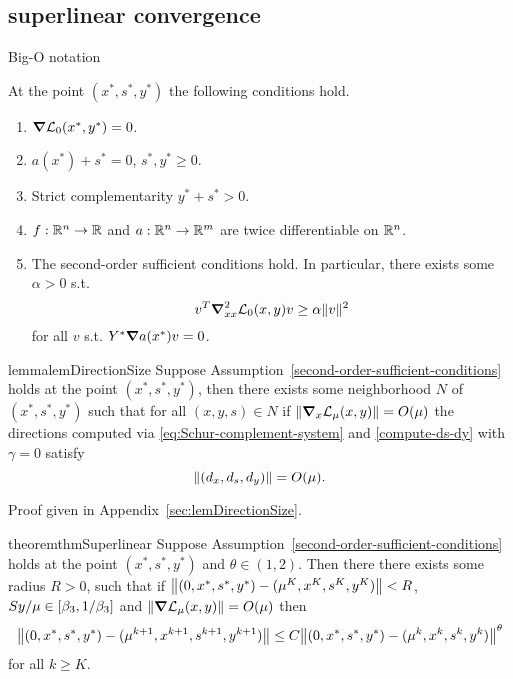 \documentclass{article}
\begin{document}

\if{}

\subsection{superlinear convergence}


\begin{definition}
Big-O notation
\end{definition}

\begin{assumption}\label{second-order-sufficient-conditions}
At the point $(x^{*},s^{*},y^{*})$ the following conditions hold.
\begin{enumerate}
\item $\grad \mathcal{L}_{0}(x^{*}, y^{*}) = 0$.
\item $a(x^{*}) + s^{*} = 0$, $s^{*}, y^{*} \ge 0$.
\item Strict complementarity $y^{*} + s^{*} > 0$.
\item $f : \mathbb{R}^{n} \rightarrow \mathbb{R}$ and $a : \mathbb{R}^{n} \rightarrow \mathbb{R}^{m}$ are twice differentiable on $\mathbb{R}^{n}$.
\item The second-order sufficient conditions hold. In particular, there exists some $\alpha > 0$ s.t.
$$
v^T \grad^2_{xx} \mathcal{L}_{0}(x,y) v \ge \alpha \| v \|^2
$$
for all $v$ s.t. $Y^{*} \grad a(x^{*}) v = 0$.
\end{enumerate}
\end{assumption}

\begin{restatable}{lemma}{lemDirectionSize}\label{lemDirectionSize}
Suppose Assumption~\ref{second-order-sufficient-conditions} holds at the point $(x^{*}, s^{*}, y^{*})$, then there exists some neighborhood $N$ of $(x^{*},s^{*},y^{*})$ such that for all $(x,y,s) \in N$ if $\| \grad_{x} \mathcal{L}_{\mu}(x,y) \|  = O(\mu)$ the directions computed via \eqref{eq:Schur-complement-system} and \eqref{compute-ds-dy} with  $\gamma = 0$ satisfy 
$$\| (d_{x}, d_{s}, d_{y}) \| =  O( \mu  ).$$
\end{restatable}

Proof given in Appendix~\ref{sec:lemDirectionSize}.

\begin{restatable}{theorem}{thmSuperlinear}\label{thmSuperlinear}
Suppose Assumption~\ref{second-order-sufficient-conditions} holds at the point $(x^{*}, s^{*}, y^{*})$ and $\theta \in (1,2)$. Then there there exists some radius $R > 0$, such that if  $\norm{ (0,x^{*},s^{*},y^{*}) - (\mu^K,x^K,s^K,y^K) } < R$, $Sy / \mu \in [\beta_{3}, 1/\beta_{3}]$
and $\norm{ \grad \mathcal{L}_{\mu}(x,y) } = O(\mu)$ 
then
$$
\norm{(0,x^{*},s^{*},y^{*}) - (\mu^{k+1},x^{k+1},s^{k+1},y^{k+1})} \le C \norm{ (0,x^{*},s^{*},y^{*}) - (\mu^{k},x^{k},s^{k},y^{k}) }^{\theta}
$$
for all $k \ge K$.
\end{restatable}
\end{document}

